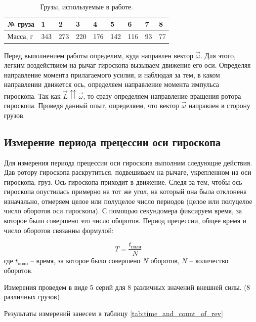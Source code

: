 \documentclass[12pt,a4paper]{article}
\begin{document}
\begin{table}[h!]
	\begin{center}
		\begin{tabular}{|l|l|l|l|l|l|l|l|l|}
			\hline
			№ груза  & 1   & 2   & 3   & 4   & 5   & 6   & 7  & 8  \\ \hline
			Масса, г & 343 & 273 & 220 & 176 & 142 & 116 & 93 & 77 \\ \hline
		\end{tabular}
		\caption{Грузы, используемые в работе.}
		\label{tab:load_mass}
	\end{center}
\end{table}

Перед выполнением работы определим, куда направлен вектор $\vec{\omega}$. Для этого, легким воздействием на рычаг гироскопа вызываем движение его оси. Определяя направление момента прилагаемого усилия, и наблюдая за тем, в каком направлении движется ось, определяем направление момента импульса гироскопа. Так как $\vec{L}\upuparrows \vec{\omega}$, то сразу определяем направление вращения ротора гироскопа. Проведя данный опыт, определяем, что вектор $\vec{\omega}$ направлен в сторону грузов.

\subsection{Измерение периода прецессии оси гироскопа}

	Для измерения периода прецессии оси гироскопа выполним следующие действия. Дав ротору гироскопа раскрутиться, подвешиваем на рычаге, укрепленном на оси гироскопа, груз. Ось гироскопа приходит в движение. Следя за тем, чтобы ось гироскопа опустилась примерно на тот же угол, на который она была отклонена изначально, отмеряем целое или полуцелое число периодов (целое или полуцелое число оборотов оси гироскопа). С помощью секундомера фиксируем время, за которое было совершено это число оборотов. Период прецессии, общее время и число оборотов связанны формулой:
	
	\begin{equation}
		T = \frac{t_{\text{полн}}}{N}
		\label{eq:period_equation}
	\end{equation}
где $t_{\text{полн}}$ -- время, за которое было совершено $N$ оборотов, $N$ -- количество оборотов.

Измерения проведем в виде 5 серий для 8 различных значений внешней силы. (8 различных грузов)

Результаты измерений занесем в таблицу \ref{tab:time_and_count_of_rev}
\end{document}
